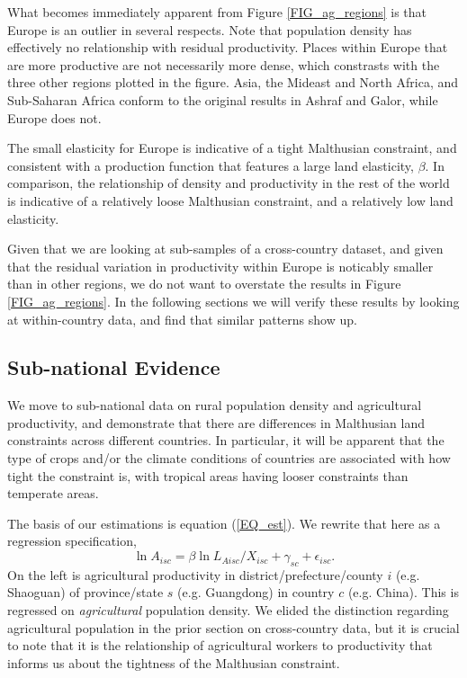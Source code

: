 \documentclass[11pt]{article}
\begin{document}
What becomes immediately apparent from Figure \ref{FIG_ag_regions} is that Europe is an outlier in several respects. Note that population density has effectively no relationship with residual productivity. Places within Europe that are more productive are not necessarily more dense, which constrasts with the three other regions plotted in the figure. Asia, the Mideast and North Africa, and Sub-Saharan Africa conform to the original results in Ashraf and Galor, while Europe does not.

The small elasticity for Europe is indicative of a tight Malthusian constraint, and consistent with a production function that features a large land elasticity, $\beta$. In comparison, the relationship of density and productivity in the rest of the world is indicative of a relatively loose Malthusian constraint, and a relatively low land elasticity. 

Given that we are looking at sub-samples of a cross-country dataset, and given that the residual variation in productivity within Europe is noticably smaller than in other regions, we do not want to overstate the results in Figure \ref{FIG_ag_regions}. In the following sections we will verify these results by looking at within-country data, and find that similar patterns show up.

\subsection{Sub-national Evidence}
We move to sub-national data on rural population density and agricultural productivity, and demonstrate that there are differences in Malthusian land constraints across different countries. In particular, it will be apparent that the type of crops and/or the climate conditions of countries are associated with how tight the constraint is, with tropical areas having looser constraints than temperate areas.

The basis of our estimations is equation (\ref{EQ_est}). We rewrite that here as a regression specification,
\begin{equation}
	\ln A_{isc} = \beta \ln L_{Aisc}/X_{isc} + \gamma_{sc} + \epsilon_{isc}. \label{EQ_regress}
\end{equation}
On the left is agricultural productivity in district/prefecture/county $i$ (e.g. Shaoguan) of province/state $s$ (e.g. Guangdong) in country $c$ (e.g. China). This is regressed on \textit{agricultural} population density. We elided the distinction regarding agricultural population in the prior section on cross-country data, but it is crucial to note that it is the relationship of agricultural workers to productivity that informs us about the tightness of the Malthusian constraint.
\end{document}
